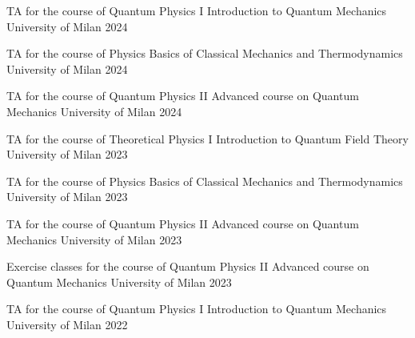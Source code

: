 
\begin{cvhonors}

    \cvhonor
    {TA for the course of Quantum Physics I} %
    {Introduction to Quantum Mechanics}
    {University of Milan} %
    {2024}

    \cvhonor
    {TA for the course of Physics} %
    {Basics of Classical Mechanics and Thermodynamics}
    {University of Milan} %
    {2024}

    \cvhonor
    {TA for the course of Quantum Physics II} %
    {Advanced course on Quantum Mechanics}
    {University of Milan} %
    {2024}

    \cvhonor
    {TA for the course of Theoretical Physics I} %
    {Introduction to Quantum Field Theory}
    {University of Milan} %
    {2023}

    \cvhonor
    {TA for the course of Physics} %
    {Basics of Classical Mechanics and Thermodynamics}
    {University of Milan} %
    {2023}

    \cvhonor
    {TA for the course of Quantum Physics II} %
    {Advanced course on Quantum Mechanics}
    {University of Milan} %
    {2023}

    \cvhonor
    {Exercise classes for the course of Quantum Physics II} %
    {Advanced course on Quantum Mechanics}
    {University of Milan} %
    {2023}

    \cvhonor
    {TA for the course of Quantum Physics I} %
    {Introduction to Quantum Mechanics}
    {University of Milan} %
    {2022}

\end{cvhonors}